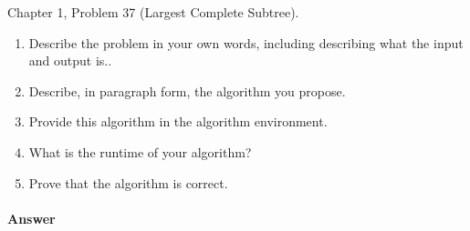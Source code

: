 \documentclass{article}
\begin{document}

\nextprob
{}

Chapter 1, Problem 37 (Largest Complete Subtree).

\begin{enumerate}
    \item Describe the problem in your own words, including
        describing what the input and output is..
    \item Describe, in paragraph form, the algorithm you propose.
    \item Provide this algorithm in the algorithm environment.
    \item What is the runtime of your algorithm?
    \item Prove that the algorithm is correct.
\end{enumerate}

\paragraph{Answer}

\end{document}
